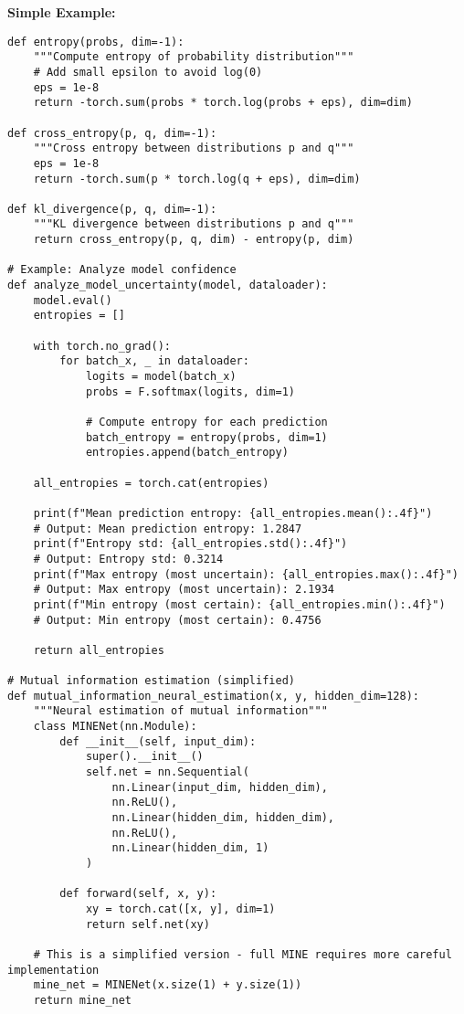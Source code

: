 \documentclass[11pt,a4paper]{book}
\begin{document}
\textbf{Simple Example:}
\begin{verbatim}
def entropy(probs, dim=-1):
    """Compute entropy of probability distribution"""
    # Add small epsilon to avoid log(0)
    eps = 1e-8
    return -torch.sum(probs * torch.log(probs + eps), dim=dim)

def cross_entropy(p, q, dim=-1):
    """Cross entropy between distributions p and q"""
    eps = 1e-8
    return -torch.sum(p * torch.log(q + eps), dim=dim)

def kl_divergence(p, q, dim=-1):
    """KL divergence between distributions p and q"""
    return cross_entropy(p, q, dim) - entropy(p, dim)

# Example: Analyze model confidence
def analyze_model_uncertainty(model, dataloader):
    model.eval()
    entropies = []
    
    with torch.no_grad():
        for batch_x, _ in dataloader:
            logits = model(batch_x)
            probs = F.softmax(logits, dim=1)
            
            # Compute entropy for each prediction
            batch_entropy = entropy(probs, dim=1)
            entropies.append(batch_entropy)
    
    all_entropies = torch.cat(entropies)
    
    print(f"Mean prediction entropy: {all_entropies.mean():.4f}")
    # Output: Mean prediction entropy: 1.2847
    print(f"Entropy std: {all_entropies.std():.4f}")
    # Output: Entropy std: 0.3214
    print(f"Max entropy (most uncertain): {all_entropies.max():.4f}")
    # Output: Max entropy (most uncertain): 2.1934
    print(f"Min entropy (most certain): {all_entropies.min():.4f}")
    # Output: Min entropy (most certain): 0.4756
    
    return all_entropies

# Mutual information estimation (simplified)
def mutual_information_neural_estimation(x, y, hidden_dim=128):
    """Neural estimation of mutual information"""
    class MINENet(nn.Module):
        def __init__(self, input_dim):
            super().__init__()
            self.net = nn.Sequential(
                nn.Linear(input_dim, hidden_dim),
                nn.ReLU(),
                nn.Linear(hidden_dim, hidden_dim),
                nn.ReLU(),
                nn.Linear(hidden_dim, 1)
            )
        
        def forward(self, x, y):
            xy = torch.cat([x, y], dim=1)
            return self.net(xy)
    
    # This is a simplified version - full MINE requires more careful implementation
    mine_net = MINENet(x.size(1) + y.size(1))
    return mine_net
\end{verbatim}
\end{document}
